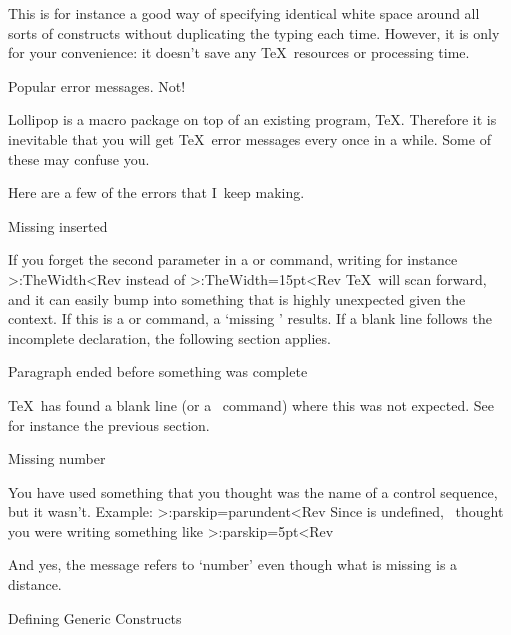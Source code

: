 This is for
instance a good way of specifying identical white space around all
sorts of constructs without duplicating the typing each time.
However, it is only for your convenience: it doesn't save any \TeX\
resources or processing time.

 Popular error messages. Not!

Lollipop is a macro package on top of an existing program, \TeX.
Therefore it is inevitable that you will get \TeX\ error messages
every once in a while. Some of these may confuse you.

Here are a few of the errors that I~keep making.

\SubSection Missing  inserted

If you forget the second parameter in a  or
 command, writing for instance
 \Ver>\Distance:TheWidth<Rev
instead of \Ver>\Distance:TheWidth=15pt<Rev
 \TeX\ will scan
forward, and it can easily bump into something that is highly
unexpected given the context. If this is a  or 
command, a `missing \cs{endcsname}' results. If a blank line follows
the incomplete declaration, the following section applies.

\SubSection  Paragraph ended before something was complete

\TeX\ has found a blank line (or a~ command) where this was
not expected. See for instance the previous section.

\SubSection Missing number

You have used something that you thought was the name of a control
sequence, but it wasn't. Example:
\Ver>\Distance:parskip=parundent<Rev
Since  is undefined, \Lollipop\ thought you were
writing something like
 \Ver>\Distance:parskip=5pt<Rev

And yes, the message refers to `number' even though what is missing
is a distance.

\ImpNote
\iSection Defining Generic Constructs

